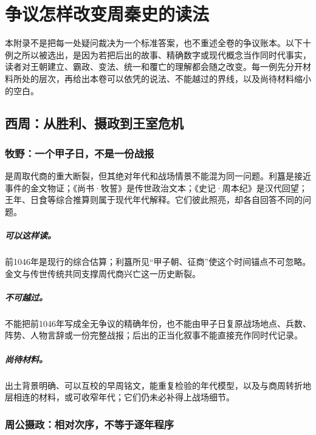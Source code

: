\chapter{争议怎样改变周秦史的读法}
\label{app:controversies}

本附录不是把每一处疑问裁决为一个标准答案，也不重述全卷的争议账本。以下十例之所以被选出，是因为若把后出的故事、精确数字或现代概念当作同时代事实，读者对王朝建立、霸政、变法、统一和覆亡的理解都会随之改变。每一例先分开材料所处的层次，再给出本卷可以依凭的说法、不能越过的界线，以及尚待材料缩小的空白。

\section{西周：从胜利、摄政到王室危机}

\subsection{牧野：一个甲子日，不是一份战报}

是周取代商的重大断裂，但其绝对年代和战场情景不能混为同一问题。利簋是接近事件的金文物证；《尚书·牧誓》是传世政治文本；《史记·周本纪》是汉代回望；王年、日食等综合推算则属于现代年代解释。它们彼此照亮，却各自回答不同的问题。

\paragraph{可以这样读。}前1046年是现行的综合估算；利簋所见“甲子朝、征商”使这个时间锚点不可忽略。金文与传世传统共同支撑周代商兴亡这一历史断裂。

\paragraph{不可越过。}不能把前1046年写成全无争议的精确年份，也不能由甲子日复原战场地点、兵数、阵势、人物言辞或一份完整战报；后出的正当化叙事不能直接充作同时代记录。

\paragraph{尚待材料。}出土背景明确、可以互校的早周铭文，能重复检验的年代模型，以及与商周转折地层相连的材料，或可收窄年代；它们仍未必补得上战场细节。

\subsection{周公摄政：相对次序，不等于逐年程序}

